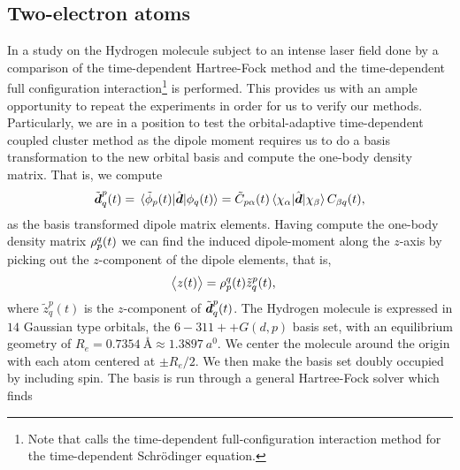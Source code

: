         \subsection{Two-electron atoms}
            In a study on the Hydrogen molecule subject to an intense laser
            field done by \citeauthor{li_2005} \cite{li_2005} a comparison of
            the time-dependent Hartree-Fock method and the time-dependent full
            configuration interaction\footnote{%
                Note that \citeauthor{li_2005} calls the time-dependent
                full-configuration interaction method for the time-dependent
                Schrödinger equation.%
            } is performed.
            This provides us with an ample opportunity to repeat the
            experiments in order for us to verify our methods.
            Particularly, we are in a position to test the orbital-adaptive
            time-dependent coupled cluster method as the dipole moment requires
            us to do a basis transformation to the new orbital basis and compute
            the one-body density matrix.
            That is, we compute
            \begin{align}
                \tilde{\boldsymbol{d}}^{p}_{q}(t)
                = \mel*{\tilde{\phi}_p(t)}{\hat{\boldsymbol{d}}}{\phi_q(t)}
                = \tilde{C}_{p\alpha}(t)
                \mel*{\chi_{\alpha}}{\hat{\boldsymbol{d}}}{\chi_{\beta}}
                C_{\beta q}(t),
            \end{align}
            as the basis transformed dipole matrix elements.
            Having compute the one-body density matrix $\rho^{q}_{p}(t)$
            we can find the induced dipole-moment along the $z$-axis by picking
            out the $z$-component of the dipole elements, that is,
            \begin{align}
                \left\langle z(t) \right\rangle
                &= \rho^{q}_{p}(t) \tilde{z}^{p}_{q}(t),
            \end{align}
            where $\tilde{z}^{p}_{q}(t)$ is the $z$-component of
            $\tilde{\boldsymbol{d}}^{p}_{q}(t)$.
            The Hydrogen molecule is expressed in $14$ Gaussian type orbitals,
            the $6-311++G(d, p)$ basis set, with an equilibrium geometry of $R_e
            = \SI{0.7354}{\angstrom} \approx \SI{1.3897}{\bohr}$.
            We center the molecule around the origin with each atom centered at
            $\pm R_e/2$.
            We then make the basis set doubly occupied by including spin.
            The basis is run through a general Hartree-Fock solver which finds
